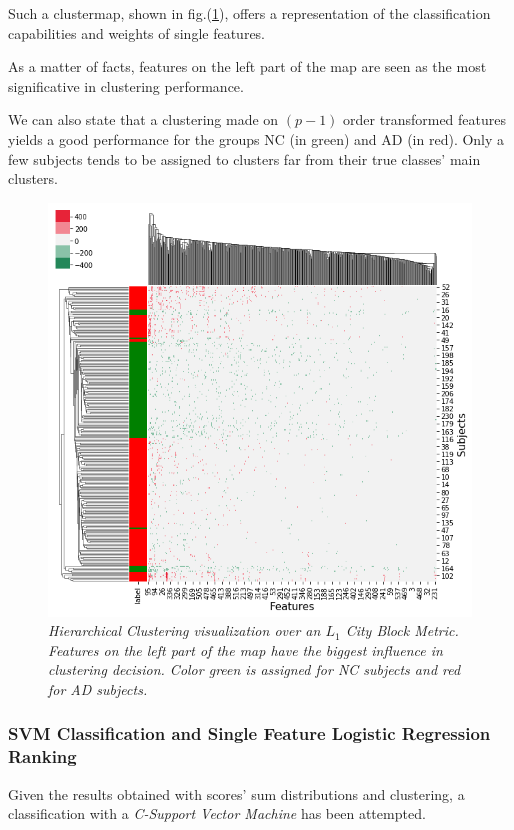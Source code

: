 \documentclass[12pt,openright,twoside,a4paper]{book}
\begin{document}
Such a clustermap, shown in fig.(\ref{ADNI-cluster}), offers a representation of the classification capabilities and weights of single features.

As a matter of facts, features on the left part of the map are seen as the most significative in clustering performance.

We can also state that a clustering made on $(p-1)$ order transformed features yields a good performance for the groups NC (in green) and AD (in red). Only a few subjects tends to be assigned to clusters far from their true classes' main clusters.

\begin{figure}[!h]
\centering
\includegraphics[scale=0.5]{diff-logpdf-clustering10}
\caption{\textit{Hierarchical Clustering visualization over an $L_1$ City Block Metric. Features on the left part of the map have the biggest influence in clustering decision. Color green is assigned for NC subjects and red for AD subjects.}}
\label{ADNI-cluster}
\end{figure}

\subsubsection*{SVM Classification and Single Feature Logistic Regression Ranking}

Given the results obtained with scores' sum distributions and clustering, a classification with a \textit{C-Support Vector Machine} has been attempted. 
\end{document}
